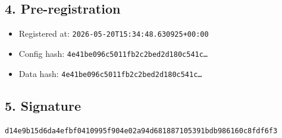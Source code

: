 \documentclass{article}
\begin{document}
\subsection*{4. Pre-registration}
\begin{itemize}
\item Registered at: \texttt{2026-05-20T15:34:48.630925+00:00}
\item Config hash: \texttt{4e41be096c5011fb2c2bed2d180c541c\dots}
\item Data hash: \texttt{4e41be096c5011fb2c2bed2d180c541c\dots}
\end{itemize}
\subsection*{5. Signature}
\texttt{d14e9b15d6da4efbf0410995f904e02a94d681887105391bdb986160c8fdf6f3}\\
\end{document}

